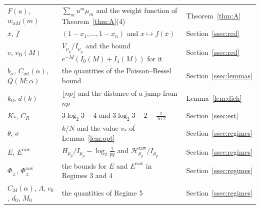 \documentclass[11pt]{amsart}
\theoremstyle{remark}
\newcommand{\Hraw}{\mathcal{H}^{\mathrm{raw}}}
\begin{document}
\begin{center}
\begin{tabular}{@{}lp{}l@{}}
$F(u)$, $w_{\alpha M}(m)$ & $\sum_m u^m\mu_m$ and the weight function of Theorem~\ref{thm:A}(4) & Theorem~\ref{thm:A} \\
$\bar x$, $\bar f$ & $(1 - x_1, \dots, 1 - x_n)$ and $x \mapsto f(\bar x)$ & Section~\ref{ssec:red} \\
$v$, $v_{\mathrm B}(M)$ & $V_{\mu_p}/I_{\mu_p}$ and the bound $e^{-M}(I_0(M) + I_1(M))$ for it & Section~\ref{ssec:red} \\
$b_\alpha$, $C_{\mathrm{int}}(\alpha)$, $Q(M;\alpha)$ & the quantities of the Poisson--Bessel bound & Section~\ref{ssec:lemmas} \\
$k_0$, $d(k)$ & $\lfloor np \rfloor$ and the distance of a jump from $np$ & Lemma~\ref{lem:dich} \\
$K_*$, $C_R$ & $3\log_2 3 - 4$ and $3\log_2 3 - 2 - \frac{1}{\ln 2}$ & Section~\ref{ssec:est} \\
$\theta$, $\sigma$ & $k/N$ and the value $v_*$ of Lemma~\ref{lem:opt} & Section~\ref{ssec:regimes} \\
$E$, $E^{\mathrm{raw}}$ & $H_{\mu_p}/I_{\mu_p} - \log_2\frac{1}{pq}$ and $\Hraw_{\mu_p}/I_{\mu_p}$ & Section~\ref{ssec:regimes} \\
$\Phi_\pm$, $\Phi_\pm^{\mathrm{raw}}$ & the bounds for $E$ and $E^{\mathrm{raw}}$ in Regimes 3 and 4 & Section~\ref{ssec:regimes} \\
$C_M(\alpha)$, $\Lambda$, $c_0$, $d_0$, $M_0$ & the quantities of Regime 5 & Section~\ref{ssec:regimes} \\
\bottomrule
\end{tabular}
\end{center}
\end{document}
